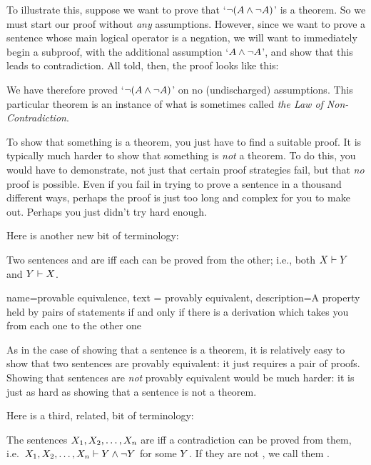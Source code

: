        To illustrate this, suppose we want to prove that `$\neg (A \mathbin{\wedge} \neg A)$' is a theorem. So we must start our proof without \emph{any} assumptions. However, since we want to prove a sentence whose main logical operator is a negation, we will want to  immediately begin a subproof, with the additional assumption `$A \mathbin{\wedge} \neg A$', and show that this leads to contradiction. All told, then, the proof looks like this:
	\begin{fitchproof}
		\open
		\close
	\end{fitchproof}
We have therefore proved `$\neg (A \mathbin{\wedge} \neg A)$' on no (undischarged) assumptions. This particular theorem is an instance of what is sometimes called \emph{the Law of Non-Contradiction}.

To show that something is a theorem, you just have to find a suitable proof. It is typically much harder to show that something is \emph{not} a theorem. To do this, you would have to demonstrate, not just that certain proof strategies fail, but that \emph{no} proof is possible. Even if you fail in trying to prove a sentence in a thousand different ways, perhaps the proof is just too long and complex for you to make out. Perhaps you just didn't try hard enough.

Here is another new bit of terminology:
	\begin{definition}
		Two sentences \metaX and \metaY are  iff each can be proved from the other; i.e., both $X\vdash Y$ and $Y\vdash X$.
	\end{definition}

{
  name=provable equivalence,
  text = provably equivalent,
description={A property held by pairs of statements if and only if there is a derivation which takes you from each one to the other one}
}


As in the case of showing that a sentence is a theorem, it is relatively easy to show that two sentences are provably equivalent: it just requires a pair of proofs. Showing that sentences are \emph{not} provably equivalent would be much harder: it is just as hard as showing that a sentence is not a theorem.

Here is a third, related, bit of terminology:
	\begin{definition}
		The sentences $X_1,X_2,\ldots, X_n$ are  iff a contradiction can be proved from them, i.e.\ $X_1,X_2,\ldots, X_n \vdash Y\mathbin{\wedge}\neg Y$ for some $Y$. If they are not , we call them \define{provably consistent}.
	\end{definition}

